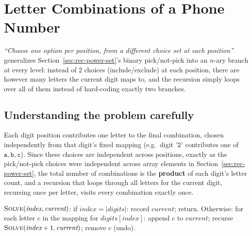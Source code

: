 \section{Letter Combinations of a Phone Number}
\label{sec:rec-letter-combinations}


\begin{patternbox}
\emph{``Choose one option per position, from a different choice set at
each position''} generalizes Section~\ref{sec:rec-power-set}'s binary
pick/not-pick into an $n$-ary branch at every level: instead of $2$
choices (include/exclude) at each position, there are however many
letters the current digit maps to, and the recursion simply loops over
all of them instead of hard-coding exactly two branches.
\end{patternbox}

\subsection*{Understanding the problem carefully}

Each digit position contributes one letter to the final combination,
chosen independently from that digit's fixed mapping (e.g.\ digit
$\texttt{'2'}$ contributes one of $\texttt{a},\texttt{b},\texttt{c}$).
Since these choices are independent across positions, exactly as the
pick/not-pick choices were independent across array elements in
Section~\ref{sec:rec-power-set}, the total number of combinations is the
\textbf{product} of each digit's letter count, and a recursion that
loops through all letters for the current digit, recursing once per
letter, visits every combination exactly once.

\begin{ideabox}
$\textsc{Solve}(\textit{index}, \textit{current})$: if
$\textit{index} = |\textit{digits}|$: record $\textit{current}$;
return. Otherwise: for each letter $c$ in the mapping for
$\textit{digits}[\textit{index}]$: append $c$ to $\textit{current}$;
recurse $\textsc{Solve}(\textit{index}+1, \textit{current})$; remove $c$
(undo).
\end{ideabox}

